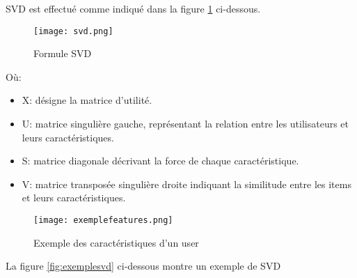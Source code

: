 SVD est effectué comme indiqué dans la figure \ref{fig:svd} ci-dessous.

\begin{figure}[H]
	\centering
	\texttt{[image: svd.png]}
	\caption{Formule SVD}
	\label{fig:svd}
\end{figure}
Où:
\begin{itemize}
	\item  X: désigne la matrice d'utilité.
	\item  U: matrice singulière gauche, représentant la relation entre les utilisateurs et leurs caractéristiques.
	\item  S: matrice diagonale décrivant la force de chaque caractéristique.
	\item  V: matrice transposée singulière droite indiquant la similitude entre les items et leurs caractéristiques.
\end{itemize}



\begin{figure}[H]
	\centering
	\texttt{[image: exemplefeatures.png]}
	\caption{Exemple des caractéristiques d'un user \cite{ref31}}
	\label{fig:exemplefeatures}
\end{figure}

La figure \ref{fig:exemplesvd} ci-dessous montre un exemple de SVD

